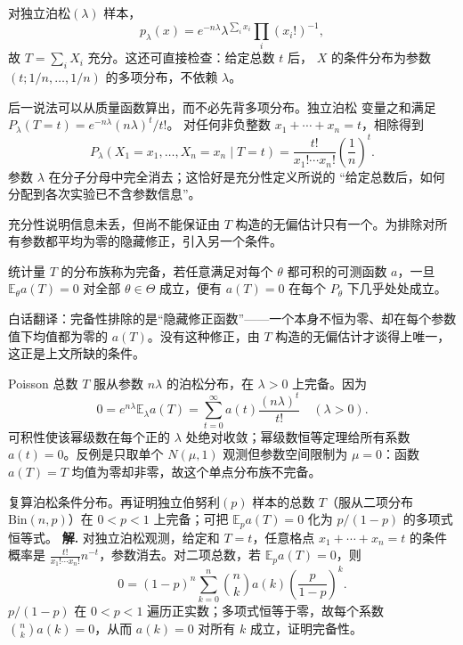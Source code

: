 对独立泊松\((\lambda)\) 样本，
\[
p_\lambda(x)=e^{-n\lambda}\lambda^{\sum_i x_i}\prod_i(x_i!)^{-1},
\]
故 \(T=\sum_iX_i\) 充分。这还可直接检查：给定总数 \(t\) 后，
\(X\) 的条件分布为参数 \((t;1/n,\ldots,1/n)\) 的多项分布，不依赖 \(\lambda\)。

后一说法可以从质量函数算出，而不必先背多项分布。独立泊松
变量之和满足 \(P_\lambda(T=t)=e^{-n\lambda}(n\lambda)^t/t!\)。
对任何非负整数 \(x_1+\cdots+x_n=t\)，相除得到
\[
P_\lambda(X_1=x_1,\ldots,X_n=x_n\mid T=t)
=\frac{t!}{x_1!\cdots x_n!}\left(\frac1n\right)^t.
\]
参数 \(\lambda\) 在分子分母中完全消去；这恰好是充分性定义所说的
“给定总数后，如何分配到各次实验已不含参数信息”。

充分性说明信息未丢，但尚不能保证由 \(T\) 构造的无偏估计只有一个。为排除对所有参数都平均为零的隐藏修正，引入另一个条件。

\begin{definition}[完备统计量]
统计量 \(T\) 的分布族称为完备，若任意满足对每个 \(\theta\) 都可积的可测函数 \(a\)，一旦
\(\mathbb E_\theta a(T)=0\) 对全部 \(\theta\in\Theta\) 成立，便有
\(a(T)=0\) 在每个 \(P_\theta\) 下几乎处处成立。
\end{definition}

白话翻译：完备性排除的是“隐藏修正函数”——一个本身不恒为零、却在每个参数值下均值都为零的 \(a(T)\)。没有这种修正，由 \(T\) 构造的无偏估计才谈得上唯一，这正是上文所缺的条件。

Poisson 总数 \(T\) 服从参数 \(n\lambda\) 的泊松分布，在 \(\lambda>0\) 上完备。因为
\[
0=e^{n\lambda}\mathbb E_\lambda a(T)
=\sum_{t=0}^\infty a(t)\frac{(n\lambda)^t}{t!}
\quad(\lambda>0).
\]
可积性使该幂级数在每个正的 \(\lambda\) 处绝对收敛；幂级数恒等定理给所有系数 \(a(t)=0\)。反例是只取单个 \(N(\mu,1)\) 观测但参数空间限制为 \(\mu=0\)：函数 \(a(T)=T\) 均值为零却非零，故这个单点分布族不完备。



\par
\begin{workedexample}
复算泊松条件分布。再证明独立伯努利\((p)\) 样本的总数 \(T\)（服从二项分布 \(\mathrm{Bin}(n,p)\)）在 \(0<p<1\) 上完备；可把 \(\mathbb E_p a(T)=0\) 化为 \(p/(1-p)\) 的多项式恒等式。
\textbf{解.} 对独立泊松观测，给定和 \(T=t\)，任意格点 \(x_1+\cdots+x_n=t\) 的条件概率是 \(\frac{t!}{x_1!\cdots x_n!}n^{-t}\)，参数消去。对二项总数，若 \(\mathbb E_pa(T)=0\)，则
\[
0=(1-p)^n\sum_{k=0}^n {n\choose k}a(k)\left(\frac p{1-p}\right)^k.
\]
\(p/(1-p)\) 在 \(0<p<1\) 遍历正实数；多项式恒等于零，故每个系数 \({n\choose k}a(k)=0\)，从而 \(a(k)=0\) 对所有 \(k\) 成立，证明完备性。
\end{workedexample}
\par
